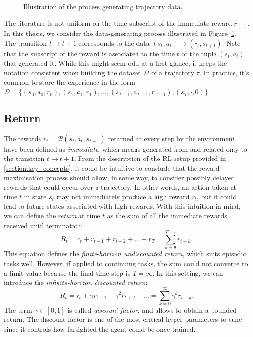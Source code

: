 \begin{figure}
    \centering
    \caption{Illustration of the process generating trajectory data.}
    \label{fig:data_generating_process_mdp}
\end{figure}

\begin{remark*}
%
The literature is not uniform on the time subscript of the immediate reward $r_{(\cdot)}$.
In this thesis, we consider the data-generating process illustrated in Figure~\ref{fig:data_generating_process_mdp}.
The transition $t \rightarrow t+1$ corresponds to the data $(s_t, a_t) \rightarrow (r_t, s_{t+1})$.
Note that the subscript of the reward is associated to the time $t$ of the tuple $(s_t, a_t)$ that generated it.
While this might seem odd at a first glance, it keeps the notation consistent when building the dataset $\mathcal{D}$ of a trajectory $\tau$.
In practice, it's common to store the experience in the form $\mathcal{D} = \{(s_0, a_0, r_0), (s_1, a_1, r_1), \dots, (s_{T-1}, a_{T-1}, r_{T-1}), (s_T, \cdot, 0)\}$.
%
\end{remark*}

\subsection{Return}

The rewards $r_t = \mathcal{R}(s_t, a_t, s_{t+1})$ returned at every step by the environment have been defined as \emph{immediate}, which means generated from and related only to the transition $t \rightarrow t+1$.
From the description of the \ac{RL} setup provided in \ref{section:key_concepts}, it could be intuitive to conclude that the reward maximisation process should allow, in some way, to consider possibly delayed rewards that could occur over a trajectory.
In other words, an action taken at time $t$ in state $s_t$ may not immediately produce a high reward $r_t$, but it could lead to future states associated with high rewards.
With this intuition in mind, we can define the \emph{return} at time $t$ as the sum of all the immediate rewards received until termination:
%
\begin{equation*}
    R_t = r_t + r_{t+1} + r_{t+2} + \dots + r_T = \sum_{k=0}^{T - t} r_{t+k} .
\end{equation*}
%
This equation defines the \emph{finite-horizon undiscounted return}, which suits episodic tasks well.
However, if applied to continuing tasks, the sum could not converge to a limit value because the final time step is $T=\infty$.
In this setting, we can introduce the \emph{infinite-horizon discounted return}:
%
\begin{equation*}
    R_t = r_t + \gamma r_{t+1} + \gamma^2 r_{t+2} + \dots = \sum_{k=0}^{\infty} \gamma^k r_{t+k} .
\end{equation*}
%
The term $\gamma \in [0, 1]$ is called \emph{discount factor}, and allows to obtain a bounded return.
The discount factor is one of the most critical hyper-parameters to tune since it controls how farsighted the agent could be once trained.


